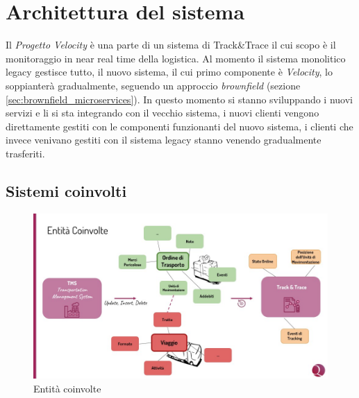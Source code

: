 \chapter{Architettura del sistema}
\label{ch:architecture}
Il \textit{Progetto Velocity} è una parte di un sistema di Track\&Trace il cui scopo è il monitoraggio in near real time della logistica.
Al momento il sistema monolitico legacy gestisce tutto, il nuovo sistema, il cui primo componente è \textit{Velocity}, lo soppianterà gradualmente, seguendo un approccio \textit{brownfield} (sezione \ref{sec:brownfield_microservices}). 
In questo momento si stanno sviluppando i nuovi servizi e li si sta integrando con il vecchio sistema, i nuovi clienti vengono direttamente gestiti con le componenti
funzionanti del nuovo sistema, i clienti che invece venivano gestiti con il sistema legacy stanno venendo gradualmente trasferiti.

\section{Sistemi coinvolti}
\label{sec:architecture_entity}

\begin{figure}[H]
\centering
    \includegraphics[width=\textwidth]{images/architecture/entita_coinvolte.jpg}
    \caption{Entità coinvolte}
    \label{fig:architecture_entities_img}
\end{figure}

